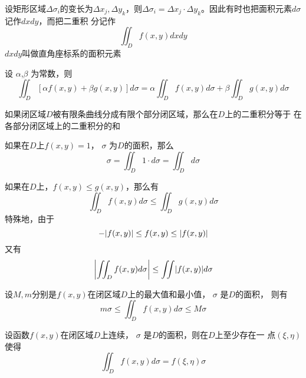 \documentclass[11pt]{article}
\begin{document}
设矩形区域\(\Delta \sigma_i\)的变长为\(\Delta x_j,\Delta y_k\)，则\(\Delta \sigma_i=\Delta
   x_j\cdot\Delta y_k\)。因此有时也把面积元素\(d\sigma\)记作\(dxdy\)，而把二重积
分记作
\begin{equation*}
\iint_Df(x,y)dxdy
\end{equation*}
\(dxdy\)叫做直角座标系的面积元素

\begin{proposition}[]
设 \(\alpha\),\(\beta\) 为常数，则
\begin{equation*}
\iint_D[\alpha f(x,y)+\beta g(x,y)]d\sigma=\alpha\iint_Df(x,y)d\sigma+
\beta\iint_Dg(x,y)d\sigma
\end{equation*}
\end{proposition}

\begin{proposition}[可加性]
如果闭区域\(D\)被有限条曲线分成有限个部分闭区域，那么在\(D\)上的二重积分等于
在各部分闭区域上的二重积分的和
\end{proposition}

\begin{proposition}[]
如果在\(D\)上\(f(x,y)=1\)， \(\sigma\) 为\(D\)的面积，那么
\begin{equation*}
\sigma=\iint_D1\cdot d\sigma=\iint_Dd\sigma
\end{equation*}
\end{proposition}

\begin{proposition}[]
如果在\(D\)上，\(f(x,y)\le g(x,y)\)，那么有
\begin{equation*}
\iint_Df(x,y)d\sigma\le \iint_Dg(x,y)d\sigma
\end{equation*}
特殊地，由于
\begin{equation*}
-\abs{f(x,y)}\le f(x,y)\le\abs{f(x,y)}
\end{equation*}
又有
\begin{equation*}
\abs{\iint_Df(x,y)d\sigma}\le\iint\abs{f(x,y)}d\sigma
\end{equation*}
\end{proposition}

\begin{proposition}[]
设\(M,m\)分别是\(f(x,y)\)在闭区域\(D\)上的最大值和最小值， \(\sigma\) 是\(D\)的面积，
则有
\begin{equation*}
m\sigma\le\iint_Df(x,y)d\sigma\le M\sigma
\end{equation*}
\end{proposition}

\begin{proposition}[二重积分的中值定理]
设函数\(f(x,y)\)在闭区域\(D\)上连续， \(\sigma\) 是\(D\)的面积，则在\(D\)上至少存在一
点\((\xi,\eta)\)使得
\begin{equation*}
\iint_Df(x,y)d\sigma=f(\xi,\eta)\sigma
\end{equation*}
\end{proposition}
\end{document}
